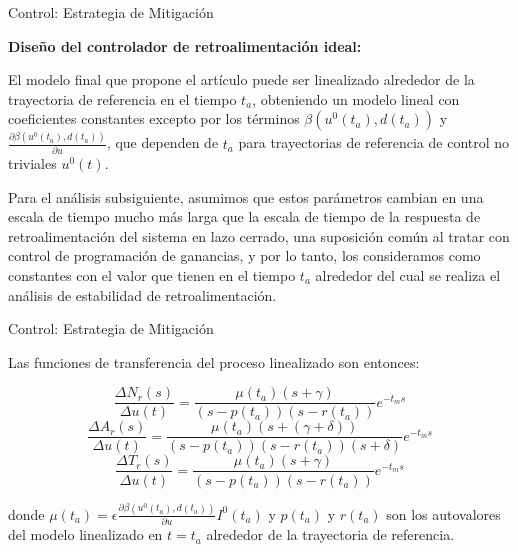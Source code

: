 \documentclass{beamer}
\begin{document}
\begin{frame}{Control: Estrategia de Mitigación}
\begin{justify}
\small

\textbf{Diseño del controlador de retroalimentación ideal:}

\vspace{0.2cm}
El modelo final que propone el artículo puede ser linealizado alrededor de la trayectoria de referencia en el tiempo \( t_a \), obteniendo un modelo lineal con coeficientes constantes excepto por los términos \( \beta(u^0(t_a),d(t_a))\) y \( \frac{\partial \beta(u^0(t_a),d(t_a))}{\partial u} \), que dependen de \( t_a \) para trayectorias de referencia de control no triviales \( u^0(t) \). 

\vspace{0.3cm}
Para el análisis subsiguiente, asumimos que estos parámetros cambian en una escala de tiempo mucho más larga que la escala de tiempo de la respuesta de retroalimentación del sistema en lazo cerrado, una suposición común al tratar con control de programación de ganancias, y por lo tanto, los consideramos como constantes con el valor que tienen en el tiempo \( t_a \) alrededor del cual se realiza el análisis de estabilidad de retroalimentación. 
\end{justify}
\end{frame}

\begin{frame}{Control: Estrategia de Mitigación}
\begin{justify}
\small

Las funciones de transferencia del proceso linealizado son entonces:

\vspace{0.3cm}
\[
\frac{\Delta N_r(s)}{\Delta u(t)} = \frac{\mu(t_a)(s + \gamma)}{(s - p(t_a))(s - r(t_a))} e^{-t_m s}
\]
\[
\frac{\Delta A_r(s)}{\Delta u(t)} = \frac{\mu(t_a)(s + (\gamma + \delta))}{(s - p(t_a))(s - r(t_a))(s + \delta)} e^{-t_m s}
\]
\[
\frac{\Delta T_r(s)}{\Delta u(t)} = \frac{\mu(t_a)(s + \gamma)}{(s - p(t_a))(s - r(t_a))} e^{-t_m s}
\]

\vspace{0.3cm}
donde \( \mu(t_a) = \epsilon \frac{\partial \beta(u^0(t_a),d(t_a))}{\partial u} I^0(t_a)\) y \( p(t_a) \) y \( r(t_a) \) son los autovalores del modelo linealizado en \( t = t_a \) alrededor de la trayectoria de referencia.

\end{justify}
\end{frame}
\end{document}
